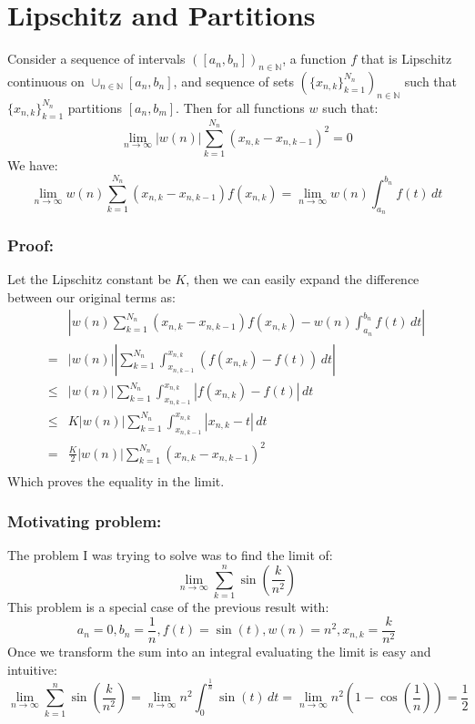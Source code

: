 
\section{Lipschitz and Partitions}
Consider a sequence of intervals $([a_n,b_n])_{n\in \mathbb{N}}$,
a function $f$ that is Lipschitz continuous on $\cup_{n\in\mathbb{N}}[a_n,b_n]$,
and sequence of sets $(\{x_{n,k}\}^{N_n}_{k=1})_{n\in\mathbb{N}}$ such that $\{x_{n,k}\}_{k=1}^{N_n}$ partitions $[a_n,b_m]$.
Then for all functions $w$ such that:
\[\lim_{n\rightarrow\infty}|w(n)|\sum_{k=1}^{N_n}(x_{n,k}-x_{n,k-1})^2 = 0\]
We have:
\[\lim_{n\rightarrow\infty}w(n)\sum_{k=1}^{N_n}(x_{n,k}-x_{n,k-1})f(x_{n,k}) = \lim_{n\rightarrow\infty}w(n)\int_{a_n}^{b_n}f(t)\,dt\]

\subsubsection{Proof:}
Let the Lipschitz constant be $K$,
then we can easily expand the difference between our original terms as:
\[\begin{aligned}
&\left|w(n)\sum_{k=1}^{N_n}(x_{n,k}-x_{n,k-1})f(x_{n,k}) - w(n)\int_{a_n}^{b_n}f(t)\,dt\right|\\
=& |w(n)|\left|\sum_{k=1}^{N_n}\int_{x_{n,k-1}}^{x_{n,k}}(f(x_{n,k}) - f(t))\,dt\right|\\
\leq& |w(n)|\sum_{k=1}^{N_n}\int_{x_{n,k-1}}^{x_{n,k}}|f(x_{n,k}) - f(t)|\,dt\\
\leq& K|w(n)|\sum_{k=1}^{N_n}\int_{x_{n,k-1}}^{x_{n,k}}|x_{n,k} - t|\,dt\\
=& \frac{K}{2}|w(n)|\sum_{k=1}^{N_n}(x_{n,k} - x_{n,k-1})^2\\
\end{aligned}\]
Which proves the equality in the limit.

\subsubsection{Motivating problem:}
The problem I was trying to solve was to find the limit of:
\[\lim_{n\rightarrow\infty}\sum_{k=1}^n\sin\left(\frac{k}{n^2}\right)\]
This problem is a special case of the previous result with:
\[a_n=0,b_n=\frac{1}{n},f(t)=\sin(t),w(n) = n^2,x_{n,k} = \frac{k}{n^2}\]
Once we transform the sum into an integral evaluating the limit is easy and intuitive:
\[\lim_{n\rightarrow\infty}\sum_{k=1}^n\sin\left(\frac{k}{n^2}\right) = \lim_{n\rightarrow\infty}n^2\int_{0}^{\frac{1}{n}}\sin(t)\,dt = \lim_{n\rightarrow\infty}n^2\left(1-\cos\left(\frac{1}{n}\right)\right) = \frac{1}{2}\]


